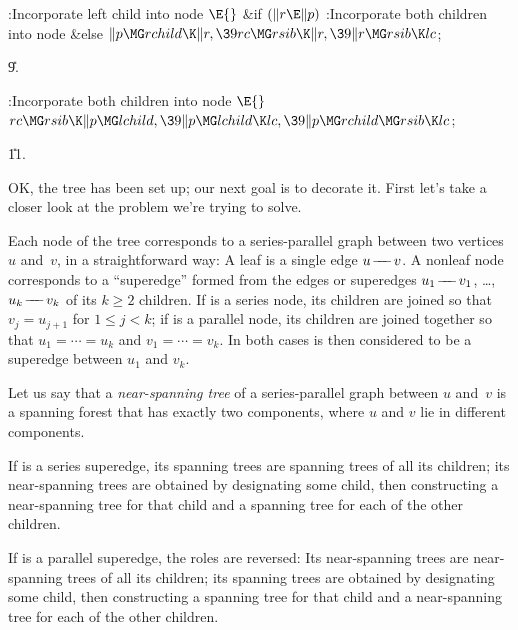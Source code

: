 \B{}:Incorporate left child into node \X${}\E{}$\6
\&{if} ${}(\|r\E\|p){}$\1\5
:Incorporate both children into node \X\2\6
\&{else}\1\5
${}\|p\MG\\{rchild}\K\|r,\39\\{rc}\MG\\{rsib}\K\|r,\39\|r\MG\\{rsib}\K%
\\{lc}{}$;\2\par
\U9.\fi

\B{}:Incorporate both children into node \X${}\E{}$\6
$\\{rc}\MG\\{rsib}\K\|p\MG\\{lchild},\39\|p\MG\\{lchild}\K\\{lc},\39\|p\MG%
\\{rchild}\MG\\{rsib}\K\\{lc}{}$;\par
\U11.\fi

OK, the tree has been set up; our next goal is to decorate it.
First let's take a closer look at the problem we're trying to solve.

Each node of the tree corresponds to a series-parallel graph between
two vertices $u$ and~$v$, in a straightforward way: A leaf is a
single edge $u\mathrel{\!\mathrel-\mkern-8mu\mathrel-\mkern-8mu\mathrel-\!} v$. A nonleaf node~ corresponds to a ``superedge''
formed from the edges or superedges $u_1\mathrel{\!\mathrel-\mkern-8mu\mathrel-\mkern-8mu\mathrel-\!} v_1$, \dots, $u_k\mathrel{\!\mathrel-\mkern-8mu\mathrel-\mkern-8mu\mathrel-\!} v_k$
of its $k\ge2$ children. If  is a series node, its children are
joined so that $v_j=u_{j+1}$ for $1\le j<k$; if  is a parallel
node, its children are joined together so that $u_1=\cdots=u_k$ and
$v_1=\cdots=v_k$. In both cases  is then considered to be a
superedge between $u_1$ and $v_k$.

Let us say that a {\it near-spanning tree\/} of a series-parallel graph
between $u$ and~$v$ is a spanning forest that has exactly two components,
where $u$ and $v$ lie in different components.

If  is a series superedge, its spanning trees are spanning trees of all
its children; its near-spanning trees are obtained by designating some child,
then constructing a near-spanning tree for that child and a spanning tree
for each of the other children.

If  is a parallel superedge, the roles are reversed: Its near-spanning
trees are near-spanning trees of all its children; its spanning trees are
obtained by designating some child, then constructing a spanning tree for
that child and a near-spanning tree for each of the other children.

